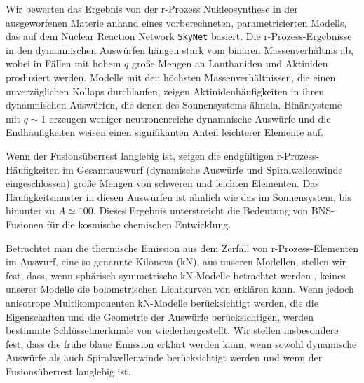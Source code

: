 Wir bewerten das Ergebnis von der r-Prozess Nukleosynthese in der ausgeworfenen Materie anhand eines vorberechneten, 
parametrisierten Modells, das auf dem Nuclear Reaction Network \texttt{SkyNet} \citep{Lippuner:2015gwa} basiert.
Die r-Prozess-Ergebnisse in den dynamnischen Auswürfen hängen stark vom binären Massenverhältnis ab, 
wobei in Fällen mit hohem $q$ große Mengen an Lanthaniden und Aktiniden produziert werden.
Modelle mit den höchsten Massenverhältnissen, die einen unverzüglichen Kollaps durchlaufen, zeigen 
Aktinidenhäufigkeiten in ihren dynamnischen Auswürfen, die denen des Sonnensystems ähneln.
Binärsysteme mit $q \sim 1$ erzeugen weniger neutronenreiche dynamnische Auswürfe und die 
Endhäufigkeiten weisen einen signifikanten Anteil leichterer Elemente auf.


Wenn der Fusionsüberrest langlebig ist, zeigen die endgültigen r-Prozess-Häufigkeiten im 
Gesamtauswurf (dynamische Auswürfe und Spiralwellenwinde eingeschlossen) große Mengen 
von schweren und leichten Elementen. 
Das Häufigkeitsmuster in diesen Auswürfen ist ähnlich wie das im Sonnensystem, bis hinunter zu $A\simeq 100$.
Dieses Ergebnis unterstreicht die Bedeutung von BNS-Fusionen für die kosmische 
chemischen Entwicklung.


Betrachtet man die thermische Emission aus dem Zerfall von r-Prozess-Elementen im Auswurf, eine so genannte Kilonova (kN), 
aus unseren Modellen, stellen wir fest, dass, wenn sphärisch symmetrische kN-Modelle betrachtet werden 
\citep{Villar:2017wcc}, keines unserer Modelle 
die bolometrischen Lichtkurven von \AT{} erklären kann.
Wenn jedoch anisotrope Multikomponenten kN-Modelle berücksichtigt werden, 
die die Eigenschaften und die Geometrie der Auswürfe berücksichtigen, 
werden bestimmte Schlüsselmerkmale von \AT{} wiederhergestellt.
Wir stellen insbesondere fest, dass die frühe blaue Emission erklärt werden kann, wenn sowohl dynamische Auswürfe als auch Spiralwellenwinde berücksichtigt werden und wenn der Fusionsüberrest langlebig ist.

